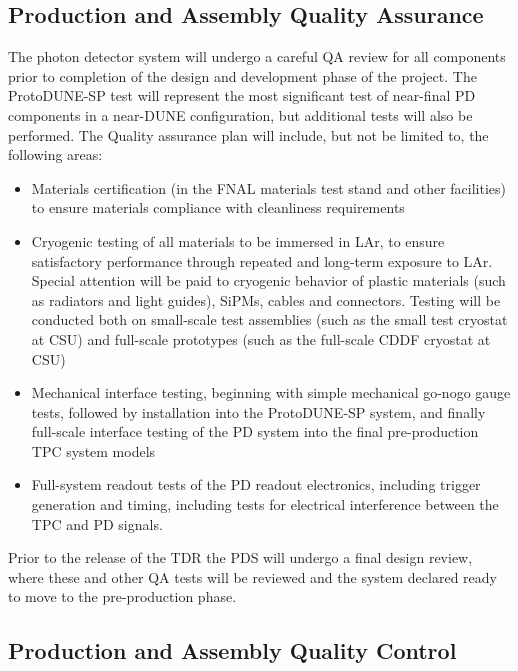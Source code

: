\subsection{Production and Assembly Quality Assurance}
\label{sec:fdsp-pd-prodqa}

The photon detector system will undergo a careful QA review for all components prior to completion of the design and development phase of the project.  The ProtoDUNE-SP test will represent the most significant test of near-final PD components in a near-DUNE configuration, but additional tests will also be performed.  The Quality assurance plan will include, but not be limited to, the following areas:

\begin{itemize}
\item Materials certification (in the FNAL materials test stand and other facilities) to ensure materials compliance with cleanliness requirements
\item Cryogenic testing of all materials to be immersed in LAr, to ensure satisfactory performance through repeated and long-term exposure to LAr.  Special attention will be paid to cryogenic behavior of plastic materials (such as radiators and light guides), SiPMs, cables and connectors.  Testing will be conducted both on small-scale test assemblies (such as the small test cryostat at CSU) and full-scale prototypes (such as the full-scale CDDF cryostat at CSU) 
\item Mechanical interface testing, beginning with simple mechanical go-nogo gauge tests, followed by installation into the ProtoDUNE-SP system, and finally full-scale interface testing of the PD system into the final pre-production TPC system models
\item Full-system readout tests of the PD readout electronics, including trigger generation and timing, including tests for electrical interference between the TPC and PD signals.
\end{itemize}

Prior to the release of the TDR the PDS will undergo a final design review, where these and other QA tests will be reviewed and the system declared ready to move to the pre-production phase.


\subsection{Production and Assembly Quality Control}
\label{sec:fdsp-pd-prodqc}


